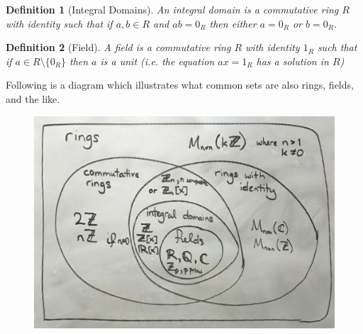 \documentclass{article}
\theoremstyle{break}
\newtheorem{definition}{Definition}[subsection]
\begin{document}
\begin{definition}[Integral Domains]
  An integral domain is a commutative ring $R$ with identity such that if $a, b
  \in R$ and $ab = 0_R$ then either $a = 0_R$ or $b = 0_R$.
\end{definition}

\begin{definition}[Field]
  A field is a commutative ring $R$ with identity $1_R$ such that if $a \in R
  \setminus \{0_R\}$ then $a$ is a unit (i.e. the equation $ax = 1_R$ has a
  solution in $R$)
\end{definition}

Following is a diagram which illustrates what common sets are also rings,
fields, and the like.

\begin{figure}
  \includegraphics[width=\linewidth]{ring-venn-diagram.jpg}
\end{figure}

\end{document}
